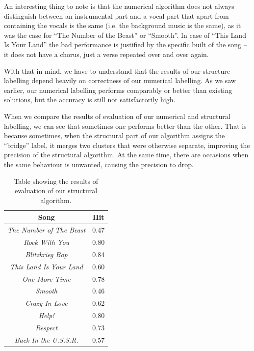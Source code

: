 An interesting thing to note is that the numerical algorithm does not always distinguish between an instrumental part and a vocal part that apart from containing the vocals is the same (i.e. the background music is the same), as it was the case for ``The Number of the Beast'' or ``Smooth''. In case of ``This Land Is Your Land'' the bad performance is justified by the specific built of the song -- it does not have a chorus, just a verse repeated over and over again. 

With that in mind, we have to understand that the results of our structure labelling depend heavily on correctness of our numerical labelling. As we saw earlier, our numerical labelling performs comparably or better than existing solutions, but the accuracy is still not satisfactorily high.

When we compare the results of evaluation of our numerical and structural labelling, we can see that sometimes one performs better than the other. That is because sometimes, when the structural part of our algorithm assigns the ``bridge'' label, it merges two clusters that were otherwise separate, improving the precision of the structural algorithm. At the same time, there are occasions when the same behaviour is unwanted, causing the precision to drop. 


\begin{table}
\begin{center}
\begin{tabular}{| c | c |} \hline 
Song  											&  Hit		\\ \hline \hline
\textit{The Number of The Beast} 	&  0.47	\\ \hline
\textit{Rock With You}						&	0.80	\\ \hline
\textit{Blitzkrieg Bop} 						&	0.84	\\ \hline
\textit{This Land Is Your Land} 		&	0.60	\\ \hline
\textit{One More Time}					&	0.78	\\ \hline
\textit{Smooth}								&	0.46	\\ \hline
\textit{Crazy In Love}						&	0.62	\\ \hline
\textit{Help!}									&	0.80	\\ \hline
\textit{Respect}								&	0.73	\\ \hline
\textit{Back In the U.S.S.R.}				&	0.57	\\ \hline

\end{tabular}
\caption{Table showing the results of evaluation of our structural algorithm.}
\label{table:labelresults}
\end{center}
\end{table}

